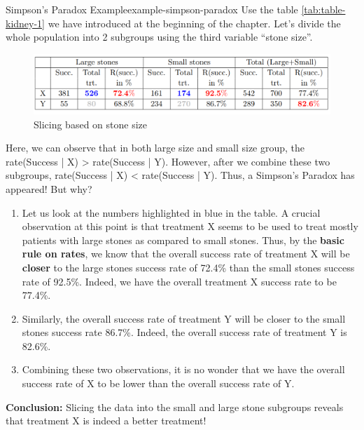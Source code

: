 \documentclass[math,code]{amznotes}
\theoremstyle{remark}
\begin{document}
\begin{exbox}{Simpson's Paradox Example}{example-simpson-paradox}
    Use the table \ref{tab:table-kidney-1} we have introduced at the beginning of the chapter. Let's divide the whole population into 2 subgroups using the third variable ``stone size''.
    \begin{figure}[H]
        \centering
        \includegraphics[width=0.75\linewidth]{images/cahpter2-simpson-rule-slicing-example.png}
        \caption{Slicing based on stone size}
        \label{fig:simpson-rule-example}
    \end{figure}
    Here, we can observe that in both large size and small size group, the rate(Success | X) > rate(Success | Y). However, after we combine these two subgroups, rate(Success | X) < rate(Success | Y). Thus, a Simpson's Paradox has appeared! But why?
    \begin{enumerate}
        \item Let us look at the numbers highlighted in blue in the table. A crucial observation at this point is that treatment X seems to be used to treat mostly patients with large stones as compared to small stones. Thus, by the \textbf{basic rule on rates}, we know that the overall success rate of treatment X will be \textbf{closer} to the large stones success rate of 72.4\% than the small stones success rate of 92.5\%. Indeed, we have the overall treatment X success rate to be 77.4\%.
        \item Similarly, the overall success rate of treatment Y will be closer to the small stones success rate 86.7\%. Indeed, the overall success rate of treatment Y is 82.6\%.
        \item Combining these two observations, it is no wonder that we have the overall success rate of X to be lower than the overall success rate of Y.
    \end{enumerate}
    \textbf{Conclusion:} Slicing the data into the small and large stone subgroups reveals that treatment X is indeed a better treatment!
\end{exbox}
\end{document}
